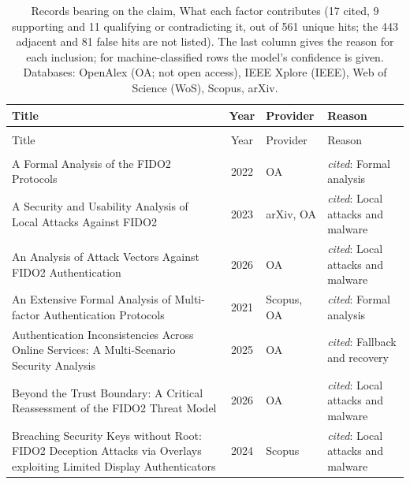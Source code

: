 
\begingroup\footnotesize
\begin{longtable}{@{}%
  >{\raggedright\arraybackslash}p{}c%
  >{\raggedright\arraybackslash}p{}%
  >{\raggedright\arraybackslash}p{}@{}}
\caption{Records bearing on the claim, What each factor contributes (17 cited, 9 supporting and 11 qualifying or contradicting it, out of 561 unique hits; the 443 adjacent and 81 false hits are not listed). The last column gives the reason for each inclusion; for machine-classified rows the model's confidence is given. Databases: OpenAlex (OA; not open access), IEEE Xplore (IEEE), Web of Science (WoS), Scopus, arXiv.}\label{tab:hits-attribution}\\
\toprule
Title & Year & Provider & Reason \\
\midrule
\endfirsthead
\multicolumn{4}{@{}l}{\emph{\tablename~\thetable{} (cont.)}}\\
\toprule
Title & Year & Provider & Reason \\
\midrule
\endhead
\midrule \multicolumn{4}{r@{}}{\emph{continued on next page}}\\
\endfoot
\bottomrule
\endlastfoot
A Formal Analysis of the FIDO2 Protocols & 2022 & OA & \emph{cited}: Formal analysis \\
A Security and Usability Analysis of Local Attacks Against FIDO2 & 2023 & arXiv, OA & \emph{cited}: Local attacks and malware \\
An Analysis of Attack Vectors Against FIDO2 Authentication & 2026 & OA & \emph{cited}: Local attacks and malware \\
An Extensive Formal Analysis of Multi-factor Authentication Protocols & 2021 & Scopus, OA & \emph{cited}: Formal analysis \\
Authentication Inconsistencies Across Online Services: A Multi-Scenario Security Analysis & 2025 & OA & \emph{cited}: Fallback and recovery \\
Beyond the Trust Boundary: A Critical Reassessment of the FIDO2 Threat Model & 2026 & OA & \emph{cited}: Local attacks and malware \\
Breaching Security Keys without Root: FIDO2 Deception Attacks via Overlays exploiting Limited Display Authenticators & 2024 & Scopus & \emph{cited}: Local attacks and malware \\

\end{longtable}
